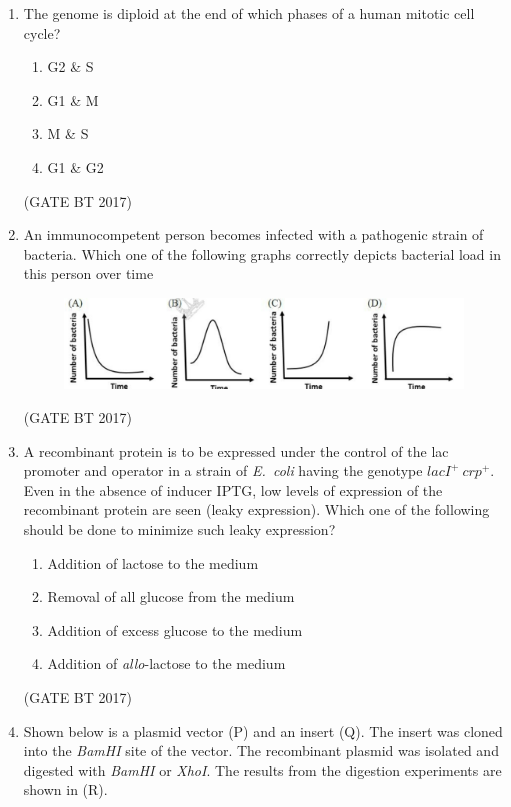 \documentclass[journal,12pt,onecolumn]{IEEEtran}
\theoremstyle{remark}
\begin{document}
\begin{enumerate}
\item The genome is diploid at the end of which phases of a human mitotic cell cycle?
\begin{enumerate}
    \item G2 \& S
    \item G1 \& M
    \item M \& S
    \item G1 \& G2
\end{enumerate}
\hfill (GATE BT 2017)

\item 
An immunocompetent person becomes infected with a pathogenic strain of bacteria. 
Which one of the following graphs correctly depicts bacterial load in this person over time
\begin{figure}
    \centering
    \includegraphics[width=\columnwidth]{figs/bacteria_load.png}
\end{figure}

\hfill (GATE BT 2017)
\item A recombinant protein is to be expressed under the control of the lac promoter and operator in a strain of \textit{E.\ coli} having the genotype $lacI^{+}\ crp^{+}$. Even in the absence of inducer IPTG, low levels of expression of the recombinant protein are seen (leaky expression). Which one of the following should be done to minimize such leaky expression?

\begin{enumerate}
    \item Addition of lactose to the medium
    \item Removal of all glucose from the medium
    \item Addition of excess glucose to the medium
    \item Addition of \textit{allo}-lactose to the medium
\end{enumerate}
\hfill (GATE BT 2017)

\item
Shown below is a plasmid vector (P) and an insert (Q). The insert was cloned into the \textit{BamHI} site of the vector. The recombinant plasmid was isolated and digested with \textit{BamHI} or \textit{XhoI}. The results from the digestion experiments are shown in (R). 


\end{enumerate}
\end{document}
